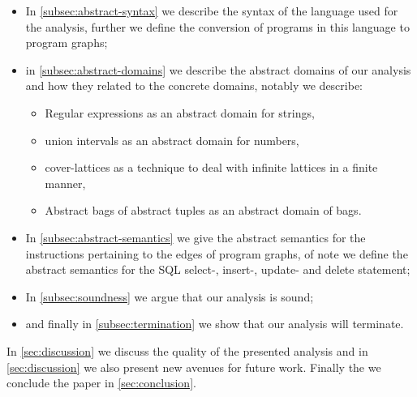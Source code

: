 \begin{itemize}
    \item In \autoref{subsec:abstract-syntax} we describe the syntax of the language used for the analysis, further we define the conversion of programs in this language to program graphs;
    \item in \autoref{subsec:abstract-domains} we describe the abstract domains of our analysis and how they related to the concrete domains, notably we describe:
    \begin{itemize}
        \item Regular expressions as an abstract domain for strings,
        \item union intervals as an abstract domain for numbers,
        \item cover-lattices as a technique to deal with infinite lattices in a finite manner,
        \item Abstract bags of abstract tuples as an abstract domain of bags.
    \end{itemize}
    \item In \autoref{subsec:abstract-semantics} we give the abstract semantics for the instructions pertaining to the edges of program graphs, of note we define the abstract semantics for the SQL select-, insert-, update- and delete statement;
    \item In \autoref{subsec:soundness} we argue that our analysis is sound;
    \item and finally in \autoref{subsec:termination} we show that our analysis will terminate.
\end{itemize}

In \autoref{sec:discussion} we discuss the quality of the presented analysis and in \autoref{sec:discussion} we also present new avenues for future work.
Finally the we conclude the paper in \autoref{sec:conclusion}.



